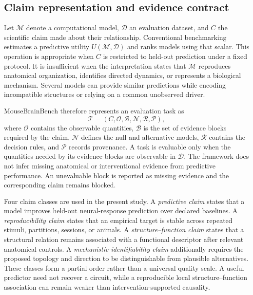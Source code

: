 \documentclass[a4paper,fleqn]{cas-sc}
\begin{document}
\subsection{Claim representation and evidence contract}
\label{subsec:claim-contract}

Let $\mathcal{M}$ denote a computational model, $\mathcal{D}$ an evaluation
dataset, and $C$ the scientific claim made about their relationship.
Conventional benchmarking estimates a predictive utility
$U(\mathcal{M},\mathcal{D})$ and ranks models using that scalar. This operation
is appropriate when $C$ is restricted to held-out prediction under a fixed
protocol. It is insufficient when the interpretation states that
$\mathcal{M}$ reproduces anatomical organization, identifies directed
dynamics, or represents a biological mechanism. Several models can provide
similar predictions while encoding incompatible structures or relying on a
common unobserved driver.

MouseBrainBench therefore represents an evaluation task as
\[
\mathcal{T}=\left(C,\mathcal{O},\mathcal{B},\mathcal{N},\mathcal{R},\mathcal{P}\right),
\]
where $\mathcal{O}$ contains the observable quantities, $\mathcal{B}$ is the
set of evidence blocks required by the claim, $\mathcal{N}$ defines the null
and alternative models, $\mathcal{R}$ contains the decision rules, and
$\mathcal{P}$ records provenance. A task is evaluable only when the quantities
needed by its evidence blocks are observable in $\mathcal{D}$. The framework
does not infer missing anatomical or interventional evidence from predictive
performance. An unevaluable block is reported as missing evidence and the
corresponding claim remains blocked.

Four claim classes are used in the present study. A \emph{predictive claim}
states that a model improves held-out neural-response prediction over declared
baselines. A \emph{reproducibility claim} states that an empirical target is
stable across repeated stimuli, partitions, sessions, or animals. A
\emph{structure--function claim} states that a structural relation remains
associated with a functional descriptor after relevant anatomical controls. A
\emph{mechanistic-identifiability claim} additionally requires the proposed
topology and direction to be distinguishable from plausible alternatives.
These classes form a partial order rather than a universal quality scale. A
useful predictor need not recover a circuit, while a reproducible local
structure--function association can remain weaker than intervention-supported
causality.
\end{document}
